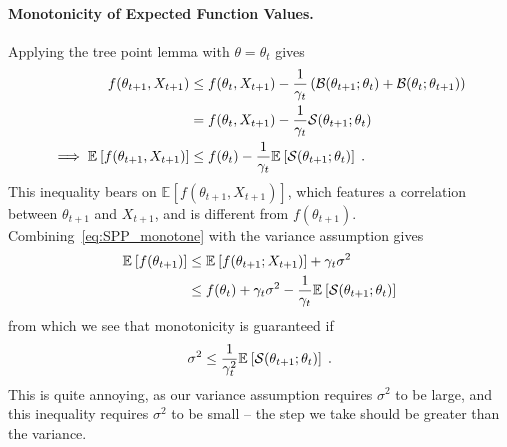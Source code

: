 \documentclass{article}
\newcommand*{\expect}[2][]{\ensuremath{\mathbb{E}_{#1} \left[ #2 \right] }} %
\newcommand{\nat}{\theta}
\newcommand{\lr}{\gamma} %
\begin{document}
\paragraph{Monotonicity of Expected Function Values.}
Applying the tree point lemma with $\nat=\nat_t$ gives
\begin{align}
	f(\nat_{t+1}, X_{t+1})  
	&\leq f(\nat_{t}, X_{t+1})  - \inv{\lr_t}\left (\cB(\nat_{t+1} ; \nat_{t}) + \cB(\nat_{t} ; \nat_{t+1}) \right) \\
	&= f(\nat_{t}, X_{t+1})  - \inv{\lr_t} \cS(\nat_{t+1} ; \nat_{t}) \\
	\implies \expect{f(\nat_{t+1}, X_{t+1})} 
	&\leq f(\nat_{t}) - \inv{\lr_t}\expect{\cS(\nat_{t+1} ; \nat_{t})}  \; .
	\label{eq:SPP_monotone}
\end{align}
This inequality bears on $\expect{f(\nat_{t+1}, X_{t+1})}$, which features a correlation between $\nat_{t+1}$ and $X_{t+1}$, and is different from $f(\nat_{t+1})$.
Combining~\eqref{eq:SPP_monotone} with the variance assumption gives
\begin{align}
	\expect{f(\nat_{t+1})} 
	&\leq \expect{f(\nat_{t+1} ; X_{t+1})}  + \lr_t \sigma^2 \\
	&\leq f(\nat_t) +  \lr_t \sigma^2 - \inv{\lr_t}\expect{\cS(\nat_{t+1} ; \nat_{t})}
\end{align}
from which we see that monotonicity is guaranteed if
\begin{align}
	\sigma^2 \leq \inv{\lr_t^2}\expect{\cS(\nat_{t+1} ; \nat_{t})} \; .
\end{align}
This is quite annoying, as our variance assumption requires $\sigma^2$ to be large, and this inequality requires $	\sigma^2 $ to be small -- the step we take should be greater than the variance.
\end{document}
